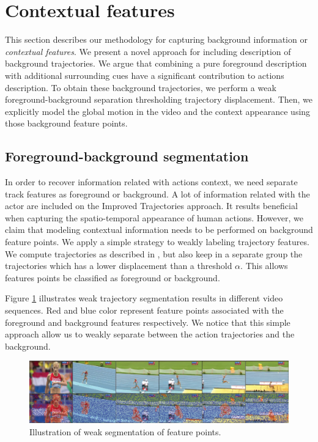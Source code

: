 \section{Contextual features}
\label{scene}
This section describes our methodology for capturing background information or \textit{contextual features}. We present a novel approach for including description of background trajectories. We argue that combining a pure foreground description \cite{wang2013} with additional surrounding cues have a significant contribution to actions description. To obtain these background trajectories, we perform a weak foreground-background separation thresholding trajectory displacement. Then, we explicitly model the global motion in the video and the context appearance using those background feature points. 

\subsection{Foreground-background segmentation}
In order to recover information related with actions context, we need separate track features as foreground or background. A lot of information related with the actor are included on the Improved Trajectories approach. It results beneficial when capturing the spatio-temporal appearance of human actions. However, we claim that modeling contextual information needs to be performed on background feature points. We apply a simple strategy to weakly labeling trajectory features. We compute trajectories as described in \cite{wang2013}, but also keep in a separate group the trajectories which has a lower displacement than a threshold $\alpha$. This allows features points be classified as foreground or background.

Figure \ref{fig:trajectory-segmentation} illustrates weak trajectory segmentation results in different video sequences. Red and blue color represent feature points associated with the foreground and background features respectively. We notice that this simple approach allow us to weakly separate between the action trajectories and the background. 

\begin{figure}[t!]
\begin{center}
\includegraphics[width=0.98\linewidth]{fig/segmentation.png}
\end{center}
\caption{Illustration of weak segmentation of feature points. }
\label{fig:trajectory-segmentation}
\end{figure}

